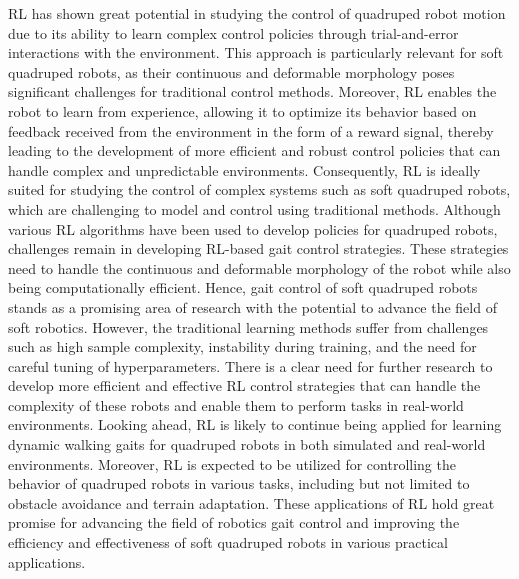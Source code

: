 \ac{RL} has shown great potential in studying the control of quadruped robot motion due to its ability to learn complex control policies through trial-and-error interactions with the environment\cite{rechtTourReinforcementLearning2019}. This approach is particularly relevant for soft quadruped robots, as their continuous and deformable morphology poses significant challenges for traditional control methods\cite{zhangEffectiveSoftRobot2017}. Moreover, \ac{RL} enables the robot to learn from experience, allowing it to optimize its behavior based on feedback received from the environment in the form of a reward signal, thereby leading to the development of more efficient and robust control policies that can handle complex and unpredictable environments\cite{jiLearningbasedControl4D2022}. Consequently, \ac{RL} is ideally suited for studying the control of complex systems such as soft quadruped robots, which are challenging to model and control using traditional methods\cite{rechtTourReinforcementLearning2019}. Although various \ac{RL} algorithms have been used to develop policies for quadruped robots\cite{cebeOnlineDynamicTrajectory2021,chignoliOnlineTrajectoryOptimization2021,chignoliRapidReliableQuadruped2022}, challenges remain in developing RL-based gait control strategies. These strategies need to handle the continuous and deformable morphology of the robot while also being computationally efficient\cite{wangEfficientLearningRobust2022}.  Hence, gait control of soft quadruped robots stands as a promising area of research with the potential to advance the field of soft robotics. However, the traditional learning methods suffer from challenges such as high sample complexity\cite{haarnojaSoftActorCriticOffPolicy2018}, instability during training\cite{zhangUnderstandingDeepLearning2021}, and the need for careful tuning of hyperparameters\cite{haarnojaSoftActorCriticAlgorithms2019}. There is a clear need for further research to develop more efficient and effective RL control strategies that can handle the complexity of these robots and enable them to perform tasks in real-world environments\cite{annaswamyAdaptiveControlIntersections2023}. Looking ahead, \ac{RL} is likely to continue being applied for learning dynamic walking gaits for quadruped robots in both simulated and real-world environments. Moreover, \ac{RL} is expected to be utilized for controlling the behavior of quadruped robots in various tasks, including but not limited to obstacle avoidance and terrain adaptation. These applications of \ac{RL} hold great promise for advancing the field of robotics gait control and improving the efficiency and effectiveness of soft quadruped robots in various practical applications.

